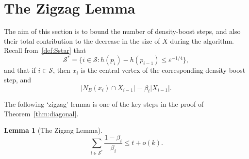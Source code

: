 \documentclass[12pt,reqno]{amsart}
\newtheorem{lemma}[theorem]{Lemma}
\theoremstyle{definition}
\theoremstyle{remark}
\def\cS{\mathcal{S}}
\newcommand\eps{\varepsilon}
\renewcommand{\le}{\leqslant}
\def\eps{\varepsilon}
\begin{document}
\section{The Zigzag Lemma}\label{zigzag:sec}

The aim of this section is to bound the number of density-boost steps, and also their total contribution to the decrease in the size of $X$ during the algorithm. Recall from~\eqref{def:Sstar} that 
$$\cS^* = \big\{ i \in \cS : h(p_i) - h(p_{i-1}) \le \eps^{-1/4} \big\},$$ 
and that if $i \in \cS$, then $x_i$ is the central vertex of the corresponding density-boost step, and
$$|N_B(x_i) \cap X_{i-1}| = \beta_i |X_{i-1}|.$$

The following `zigzag' lemma is one of the key steps in the proof of Theorem~\ref{thm:diagonal}.

\begin{lemma}[The Zigzag Lemma]\label{lem:zigzag}
\begin{equation}\label{eq:zigzag:bound}
\sum_{i \in \cS^*} \frac{1 - \beta_i}{\beta_i} \le t + o(k).
\end{equation}
\end{lemma}
\end{document}
